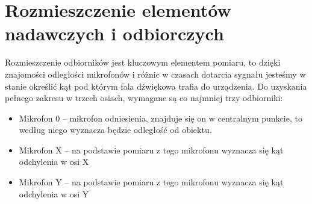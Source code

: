 





\section{Rozmieszczenie elementów nadawczych i odbiorczych}
Rozmieszczenie odbiorników jest kluczowym elementem pomiaru, to dzięki znajomości odległości mikrofonów i różnic w czasach 
dotarcia sygnału jesteśmy w stanie określić kąt pod którym fala dźwiękowa trafia do urządzenia. 
Do uzyskania pełnego zakresu w trzech osiach, wymagane są co najmniej trzy odbiorniki: 
\begin{itemize}
    \item Mikrofon 0 -- mikrofon odniesienia, znajduje się on w centralnym punkcie, to według niego wyznacza będzie odległość od obiektu.
    \item Mikrofon X -- na podstawie pomiaru z tego mikrofonu wyznacza się kąt odchylenia w osi X 
    \item Mikrofon Y -- na podstawie pomiaru z tego mikrofonu wyznacza się kąt odchylenia w osi Y
\end{itemize}

